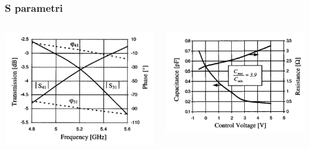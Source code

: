 \documentclass{beamer}
\begin{document}
\begin{frame}
  \frametitle{S parametri}
  \begin{columns}
    \begin{column}{0.5\textwidth}
      \includegraphics[width=\linewidth]{spar_ellinger.png}
    \end{column}
    \begin{column}{0.5\textwidth}
      \includegraphics[width=\linewidth]{varactor_tuning_range.png}
    \end{column}
  \end{columns}
\end{frame}

\end{document}
